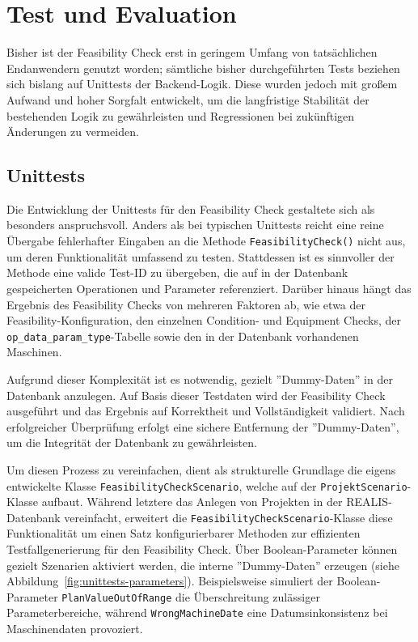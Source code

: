 \chapter{Test und Evaluation}

Bisher ist der Feasibility Check erst in geringem Umfang von tatsächlichen Endanwendern genutzt worden; sämtliche bisher durchgeführten Tests beziehen sich bislang auf Unittests der Backend-Logik. Diese wurden jedoch mit großem Aufwand und hoher Sorgfalt entwickelt, um die langfristige Stabilität der bestehenden Logik zu gewährleisten und Regressionen bei zukünftigen Änderungen zu vermeiden.

\section{Unittests}

Die Entwicklung der Unittests für den Feasibility Check gestaltete sich als besonders anspruchsvoll. Anders als bei typischen Unittests reicht eine reine Übergabe fehlerhafter Eingaben an die Methode \texttt{FeasibilityCheck()} nicht aus, um deren Funktionalität umfassend zu testen. Stattdessen ist es sinnvoller der Methode eine valide Test-ID zu übergeben, die auf in der Datenbank gespeicherten Operationen und Parameter referenziert. Darüber hinaus hängt das Ergebnis des Feasibility Checks von mehreren Faktoren ab, wie etwa der Feasibility-Konfiguration, den einzelnen Condition- und Equipment Checks, der \texttt{op\_data\_param\_type}-Tabelle sowie den in der Datenbank vorhandenen Maschinen.

Aufgrund dieser Komplexität ist es notwendig, gezielt ''Dummy-Daten'' in der Datenbank anzulegen. Auf Basis dieser Testdaten wird der Feasibility Check ausgeführt und das Ergebnis auf Korrektheit und Vollständigkeit validiert. Nach erfolgreicher Überprüfung erfolgt eine sichere Entfernung der ''Dummy-Daten'', um die Integrität der Datenbank zu gewährleisten.

Um diesen Prozess zu vereinfachen, dient als strukturelle Grundlage die eigens entwickelte Klasse \texttt{FeasibilityCheckScenario}, welche auf der \texttt{ProjektScenario}-Klasse aufbaut. Während letztere das Anlegen von Projekten in der REALIS-Daten\-bank vereinfacht, erweitert die \texttt{FeasibilityCheckScenario}-Klasse diese Funktionalität um einen Satz konfigurierbarer Methoden zur effizienten Testfallgenerierung für den Feasibility Check. Über Boolean-Parameter können gezielt Szenarien aktiviert werden, die interne ''Dummy-Daten'' erzeugen (siehe Abbildung~\ref{fig:unittests-parameters}). Beispielsweise simuliert der Boolean-Parameter \texttt{PlanValueOutOfRange} die Überschreitung zulässiger Parameterbereiche, während \texttt{WrongMachineDate} eine Datumsinkonsistenz bei Maschinendaten provoziert.

